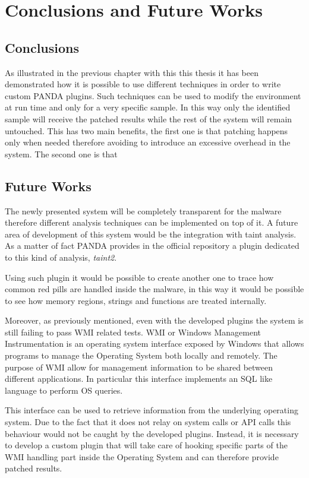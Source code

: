 \chapter{Conclusions and Future Works}
\label{chap:6}

\section{Conclusions}

As illustrated in the previous chapter with this this thesis it has been demonstrated how it is possible to use different techniques in order to write custom PANDA plugins. Such techniques can be used to modify the environment at run time and only for a very specific sample. In this way only the identified sample will receive the patched results while the rest of the system will remain untouched. This has two main benefits, the first one is that patching happens only when needed therefore avoiding to introduce an excessive overhead in the system. The second one is that 



\section{Future Works}

The newly presented system will be completely transparent for the malware therefore different analysis techniques can be implemented on top of it. A future area of development of this system would be the integration with taint analysis. As a matter of fact PANDA provides in the official repository a plugin dedicated to this kind of analysis, \textit{taint2}. 

Using such plugin it would be possible to create another one to trace how common red pills are handled inside the malware, in this way it would be possible to see how memory regions, strings and functions are treated internally.

Moreover, as previously mentioned, even with the developed plugins the system is still failing to pass WMI related tests. WMI or Windows Management Instrumentation is an operating system interface exposed by Windows that allows programs to manage the Operating System both locally and remotely. The purpose of WMI allow for management information to be shared between different applications. In particular this interface implements an SQL like language to perform OS queries.

This interface can be used to retrieve information from the underlying operating system. Due to the fact that it does not relay on system calls or API calls this behaviour would not be caught by the developed plugins. Instead, it is necessary to develop a custom plugin that will take care of hooking specific parts of the WMI handling part inside the Operating System and can therefore provide patched results. 